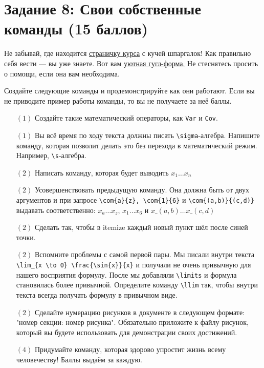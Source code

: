 \documentclass[12pt, a4paper, oneside]{article}
\begin{document}
\section*{Задание 8: Свои собственные команды  (15 баллов)  }

Не забывай, где находится  \href{https://fulyankin.github.io/LaTeX/}{страничку курса} с кучей шпаргалок! Как правильно себя вести — вы уже знаете. Вот вам \href{https://docs.google.com/forms/d/e/1FAIpQLSe11kxKVfv07iCL1E9yNX7ll9swKImiVwRr1H70lslGzInRSg/viewform}{уютная гугл-форма.}   Не стеснятесь просить о помощи, если она вам необходима.


Создайте следующие команды и продемонстрируйте как они работают. Если вы не приводите пример работы команды, то вы не получаете за неё баллы.

\begin{itemize}
	\item[$(1)$] Создайте такие математический операторы, как \verb|Var| и \verb|Cov|.
	\item[$(1)$] Вы всё время по ходу текста должны писать \verb|\sigma|-алгебра. Напишите команду, которая позволит делать это без перехода в математический режим. Например,  \verb|\s|-алгебра.
	\item[$(2)$] Написать команду, которая будет выводить $x_1 \ldots x_n$
	\item[$(2)$] Усовершенствовать предыдущую команду. Она должна быть от двух аргументов и при запросе \verb|\com{a}{z}, \com{1}{6}| и \verb|\com{(a,b)}{(c,d)}| выдавать соответственно:  $x_a \ldots x_z$, 
	$x_1 \ldots x_6$ и   $x\_{(a,b)} \ldots x\_{(c,d)}$
	\item[$(2)$] Сделать так, чтобы в itemize каждый новый пункт шёл после синей точки.
	\item[$(2)$] Вспомните проблемы с самой первой пары. Мы писали внутри текста \verb|\lim_{x \to 0} \frac{\sin{x}}{x}| и получали не очень привычную для нашего восприятия формулу. После мы добавляли \verb|\limits| и формула становилась более привычной. Определите команду \verb|\llim| так, чтобы внутри текста всегда получать формулу в привычном виде.
	\item[$(2)$] Сделайте нумерацию рисунков в документе в следующем формате: "номер секции: номер рисунка". Обязательно приложите к файлу рисунок, который вы будете использовать для демонстрации своих достижений.
	\item[$(4)$]   Придумайте команду, которая здорово упростит жизнь всему человечеству! Баллы выдаём за каждую. 
\end{itemize}
\end{document}
